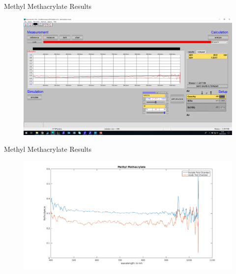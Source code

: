 \documentclass[10pt]{beamer}
\begin{document}
\begin{frame}{Methyl Methacrylate Results}
\begin{figure}
\centering
\includegraphics[width=\textwidth]{m2.png}
\end{figure}
\end{frame}

\begin{frame}{Methyl Methacrylate Results}
\begin{figure}
\centering
\includegraphics[width=\textwidth]{m3.png}
\end{figure}
\end{frame}
\end{document}
